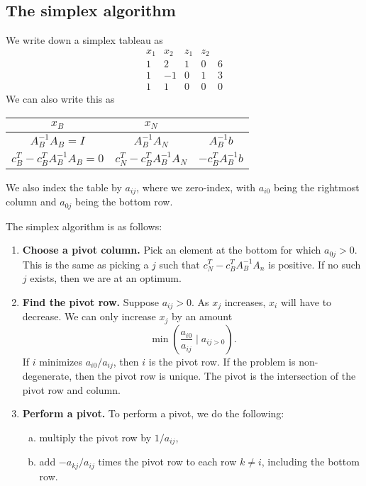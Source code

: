 \documentclass[12pt]{article}
\theoremstyle{definition}
\theoremstyle{remark}
\begin{document}
\subsection{The simplex algorithm}%
\label{sub:the_simplex_algorithm}
We write down a simplex tableau as
\[
\begin{array}{cccc|c}
	x_1 & x_2 & z_1 & z_2 & \\
	1 & 2 & 1 & 0 & 6 \\
	1 & -1 & 0 & 1 & 3 \\
	\hline
	1 & 1 & 0 & 0 & 0
\end{array}
\]
We can also write this as
\begin{center}
	\renewcommand{\arraystretch}{2}
\begin{tabular}{ccc}
$x_B$                                                & $x_N$                                           &                                        \\ \hline
\multicolumn{1}{|c|}{$A_B^{-1}A_B = I$}              & \multicolumn{1}{c|}{$A_B^{-1}A_N$}              & \multicolumn{1}{c|}{$A_B^{-1}b$}       \\ \hline
\multicolumn{1}{|c|}{$c^T_B - c^T_BA^{-1}_BA_B = 0$} & \multicolumn{1}{c|}{$c^T_N - c^T_BA^{-1}_BA_N$} & \multicolumn{1}{c|}{$-c^T_BA^{-1}_Bb$} \\ \hline
\end{tabular}
\renewcommand{\arraystretch}{1}
\end{center}

We also index the table by $a_{ij}$, where we zero-index, with $a_{i0}$ being the rightmost column and $a_{0j}$ being the bottom row.

The simplex algorithm is as follows:

\begin{enumerate}[1.]
	\item \textbf{Choose a pivot column.} Pick an element at the bottom for which $a_{0j} > 0$. This is the same as picking a $j$ such that $c^{T}_N - c^{T}_BA^{-1}_BA_n$ is positive. If no such $j$ exists, then we are at an optimum.
	\item \textbf{Find the pivot row.} Suppose $a_{ij} > 0$. As $x_j$ increases, $x_i$ will have to decrease. We can only increase $x_j$ by an amount
		\[
			\min \left( \frac{a_{i0}}{a_{ij}} \mid a_{ij > 0} \right)
		.\]
		If $i$ minimizes $a_{i0}/a_{ij}$, then $i$ is the pivot row. If the problem is non-degenerate, then the pivot row is unique. The pivot is the intersection of the pivot row and column.
	\item \textbf{Perform a pivot.} To perform a pivot, we do the following:
		\begin{enumerate}[(a)]
			\item multiply the pivot row by $1/a_{ij}$,
			\item add $-a_{kj}/a_{ij}$ times the pivot row to each row $k \neq i$, including the bottom row.
		\end{enumerate}
\end{enumerate}
\end{document}
